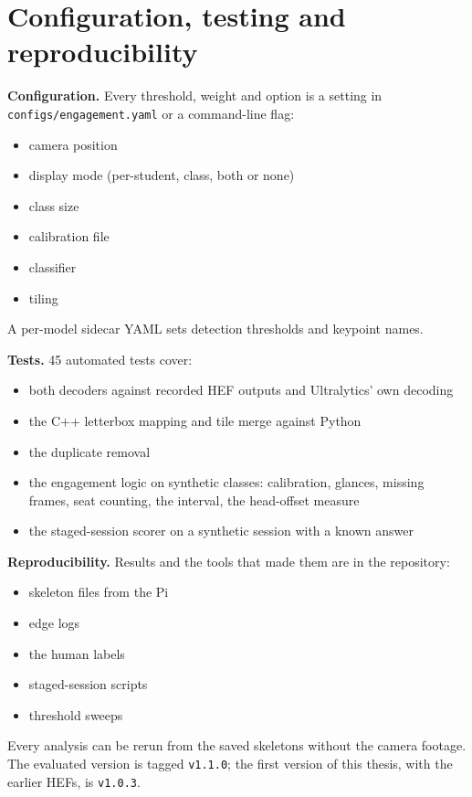 \section{Configuration, testing and reproducibility}

\textbf{Configuration.} Every threshold, weight and option is a setting in \texttt{configs/engagement.yaml} or a command-line flag:

\begin{itemize}
\tightlist
\item
  camera position
\item
  display mode (per-student, class, both or none)
\item
  class size
\item
  calibration file
\item
  classifier
\item
  tiling
\end{itemize}

A per-model sidecar YAML sets detection thresholds and keypoint names.

\textbf{Tests.} 45 automated tests cover:

\begin{itemize}
\tightlist
\item
  both decoders against recorded HEF outputs and Ultralytics' own decoding
\item
  the C++ letterbox mapping and tile merge against Python
\item
  the duplicate removal
\item
  the engagement logic on synthetic classes: calibration, glances, missing frames, seat counting, the interval, the head-offset measure
\item
  the staged-session scorer on a synthetic session with a known answer
\end{itemize}

\textbf{Reproducibility.} Results and the tools that made them are in the repository:

\begin{itemize}
\tightlist
\item
  skeleton files from the Pi
\item
  edge logs
\item
  the human labels
\item
  staged-session scripts
\item
  threshold sweeps
\end{itemize}

Every analysis can be rerun from the saved skeletons without the camera footage. The evaluated version is tagged \texttt{v1.1.0}; the first version of this thesis, with the earlier HEFs, is \texttt{v1.0.3}.
